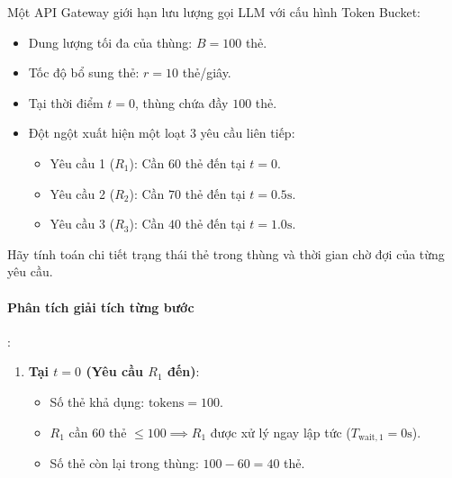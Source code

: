 \begin{example}
\label{ex:token-bucket-math}
Một API Gateway giới hạn lưu lượng gọi LLM với cấu hình Token Bucket:
\begin{itemize}
  \item Dung lượng tối đa của thùng: $B = 100$ thẻ.
  \item Tốc độ bổ sung thẻ: $r = 10$ thẻ/giây.
  \item Tại thời điểm $t = 0$, thùng chứa đầy $100$ thẻ.
  \item Đột ngột xuất hiện một loạt 3 yêu cầu liên tiếp:
    \begin{itemize}
      \item Yêu cầu 1 ($R_1$): Cần $60$ thẻ đến tại $t=0$.
      \item Yêu cầu 2 ($R_2$): Cần $70$ thẻ đến tại $t=0.5\text{s}$.
      \item Yêu cầu 3 ($R_3$): Cần $40$ thẻ đến tại $t=1.0\text{s}$.
    \end{itemize}
\end{itemize}
Hãy tính toán chi tiết trạng thái thẻ trong thùng và thời gian chờ đợi của từng yêu cầu.

\paragraph{Phân tích giải tích từng bước}:
\begin{enumerate}
  \item \textbf{Tại $t = 0$ (Yêu cầu $R_1$ đến)}:
    \begin{itemize}
      \item Số thẻ khả dụng: $\text{tokens} = 100$.
      \item $R_1$ cần $60$ thẻ $\le 100 \implies R_1$ được xử lý ngay lập tức ($T_{\text{wait}, 1} = 0\text{s}$).
      \item Số thẻ còn lại trong thùng: $100 - 60 = 40$ thẻ.
    \end{itemize}


\end{enumerate}
\end{example}
